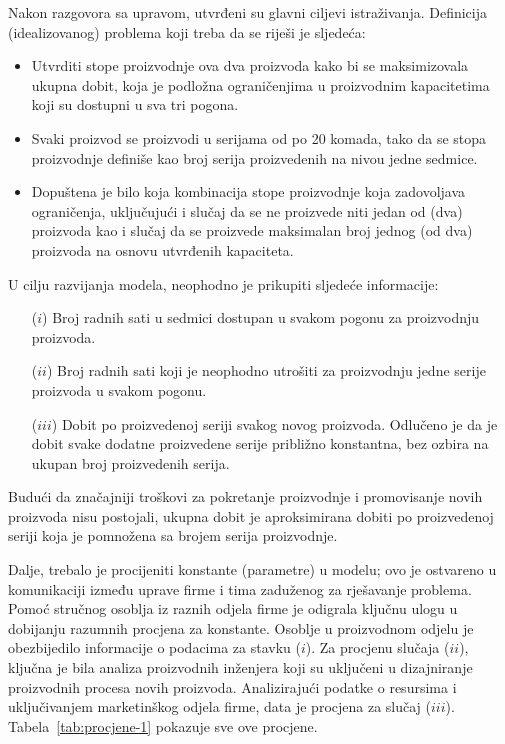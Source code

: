 \documentclass[b5paper, utf8, 11pt, colorlinks]{book}
\theoremstyle{definition}
\begin{document}
 Nakon razgovora sa upravom, utvrđeni su glavni ciljevi istraživanja. Definicija  (idealizovanog) problema koji treba da se riješi je sljedeća:
 \begin{itemize}
     \item Utvrditi  stope proizvodnje  ova dva proizvoda kako bi se maksimizovala ukupna dobit, koja je podložna ograničenjima u  proizvodnim kapacitetima koji su dostupni u sva tri pogona. 
     \item Svaki proizvod se proizvodi u serijama od po 20 komada, tako da se stopa proizvodnje definiše kao broj serija proizvedenih na nivou jedne sedmice. 
     \item Dopuštena je bilo koja kombinacija stope proizvodnje koja zadovoljava ograničenja, uključujući i slučaj da se ne proizvede niti jedan od (dva) proizvoda kao i slučaj da se proizvede maksimalan broj jednog (od dva) proizvoda na osnovu utvrđenih kapaciteta.
 \end{itemize}

 U cilju razvijanja modela, neophodno je prikupiti sljedeće informacije:
 \begin{itemize}
	 	\item[($i$)]   Broj radnih sati u sedmici dostupan u svakom pogonu za proizvodnju proizvoda.  
 	\item[($ii$)]   Broj radnih sati koji je neophodno utrošiti  za proizvodnju jedne serije proizvoda u svakom pogonu.
 		\item[($iii$)] Dobit po proizvedenoj seriji svakog novog proizvoda. Odlučeno je da je dobit svake dodatne proizvedene serije približno konstantna, bez ozbira na ukupan broj proizvedenih serija.
	
 \end{itemize} 

 Budući da značajniji troškovi za pokretanje proizvodnje i promovisanje novih proizvoda nisu postojali, ukupna dobit je aproksimirana dobiti po proizvedenoj seriji koja je pomnožena sa brojem serija proizvodnje.  


 Dalje, trebalo je procijeniti konstante (parametre)  u modelu; ovo je ostvareno u komunikaciji između uprave firme i tima zaduženog za rješavanje problema. Pomoć stručnog osoblja iz raznih odjela firme je odigrala ključnu ulogu u dobijanju razumnih procjena za konstante. 
  Osoblje u proizvodnom odjelu   je obezbijedilo informacije o podacima za stavku ($i$). Za procjenu slučaja ($ii$), ključna je bila analiza proizvodnih inženjera koji su uključeni u dizajniranje proizvodnih procesa novih proizvoda. Analizirajući podatke o resursima i uključivanjem  marketinškog odjela firme,  data je procjena za slučaj ($iii$). Tabela~\ref{tab:procjene-1} pokazuje sve ove procjene. 
\end{document}
